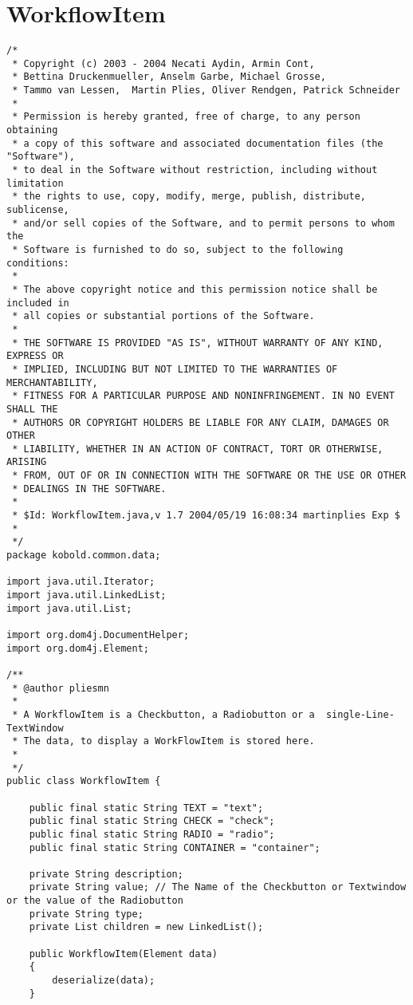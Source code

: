 \section{WorkflowItem}
\small \begin{verbatim}
/*
 * Copyright (c) 2003 - 2004 Necati Aydin, Armin Cont, 
 * Bettina Druckenmueller, Anselm Garbe, Michael Grosse, 
 * Tammo van Lessen,  Martin Plies, Oliver Rendgen, Patrick Schneider
 * 
 * Permission is hereby granted, free of charge, to any person obtaining
 * a copy of this software and associated documentation files (the "Software"),
 * to deal in the Software without restriction, including without limitation
 * the rights to use, copy, modify, merge, publish, distribute, sublicense, 
 * and/or sell copies of the Software, and to permit persons to whom the 
 * Software is furnished to do so, subject to the following conditions:
 *
 * The above copyright notice and this permission notice shall be included in 
 * all copies or substantial portions of the Software.
 *
 * THE SOFTWARE IS PROVIDED "AS IS", WITHOUT WARRANTY OF ANY KIND, EXPRESS OR 
 * IMPLIED, INCLUDING BUT NOT LIMITED TO THE WARRANTIES OF MERCHANTABILITY, 
 * FITNESS FOR A PARTICULAR PURPOSE AND NONINFRINGEMENT. IN NO EVENT SHALL THE 
 * AUTHORS OR COPYRIGHT HOLDERS BE LIABLE FOR ANY CLAIM, DAMAGES OR OTHER 
 * LIABILITY, WHETHER IN AN ACTION OF CONTRACT, TORT OR OTHERWISE, ARISING 
 * FROM, OUT OF OR IN CONNECTION WITH THE SOFTWARE OR THE USE OR OTHER 
 * DEALINGS IN THE SOFTWARE.
 *
 * $Id: WorkflowItem.java,v 1.7 2004/05/19 16:08:34 martinplies Exp $
 *
 */
package kobold.common.data;

import java.util.Iterator;
import java.util.LinkedList;
import java.util.List;

import org.dom4j.DocumentHelper;
import org.dom4j.Element;

/**
 * @author pliesmn
 *
 * A WorkflowItem is a Checkbutton, a Radiobutton or a  single-Line-TextWindow
 * The data, to display a WorkFlowItem is stored here.  
 * 
 */
public class WorkflowItem {

	public final static String TEXT = "text"; 
	public final static String CHECK = "check";
	public final static String RADIO = "radio";
	public final static String CONTAINER = "container";
	
	private String description;
	private String value; // The Name of the Checkbutton or Textwindow or the value of the Radiobutton 
	private String type;
	private List children = new LinkedList();
	
	public WorkflowItem(Element data)
	{
		deserialize(data);
	}


\end{verbatim}
